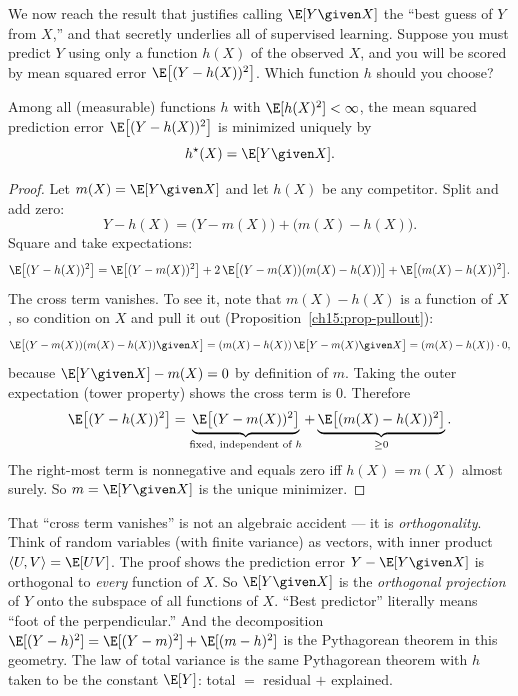 We now reach the result that justifies calling $\E[Y\given X]$ the ``best guess of $Y$ from $X$,'' and
that secretly underlies all of supervised learning. Suppose you must predict $Y$ using only a function
$h(X)$ of the observed $X$, and you will be scored by mean squared error $\E\big[(Y - h(X))^2\big]$.
Which function $h$ should you choose?

\begin{theorem}
\label{ch15:thm-best-predictor}
Among all (measurable) functions $h$ with $\E[h(X)^2] < \infty$, the mean squared prediction error
$\E\big[(Y - h(X))^2\big]$ is minimized uniquely by
\[
  h^\star(X) = \E[Y \given X].
\]
\end{theorem}

\begin{proof}
Let $m(X) = \E[Y\given X]$ and let $h(X)$ be any competitor. Split and add zero:
\[
  Y - h(X) = \big(Y - m(X)\big) + \big(m(X) - h(X)\big).
\]
Square and take expectations:
\[
  \E\big[(Y-h(X))^2\big]
  = \E\big[(Y - m(X))^2\big] + 2\,\E\big[(Y-m(X))(m(X)-h(X))\big] + \E\big[(m(X)-h(X))^2\big].
\]
The cross term vanishes. To see it, note that $m(X) - h(X)$ is a function of $X$, so condition on $X$
and pull it out (Proposition~\ref{ch15:prop-pullout}):
\[
  \E\big[(Y-m(X))(m(X)-h(X)) \given X\big]
  = (m(X)-h(X))\,\E\big[Y - m(X)\given X\big]
  = (m(X)-h(X))\cdot 0,
\]
because $\E[Y\given X] - m(X) = 0$ by definition of $m$. Taking the outer expectation (tower property)
shows the cross term is $0$. Therefore
\[
  \E\big[(Y - h(X))^2\big] = \underbrace{\E\big[(Y-m(X))^2\big]}_{\text{fixed, independent of }h}
  + \underbrace{\E\big[(m(X)-h(X))^2\big]}_{\ge 0}.
\]
The right-most term is nonnegative and equals zero iff $h(X) = m(X)$ almost surely. So $m = \E[Y\given X]$
is the unique minimizer.
\end{proof}

\begin{happeningbox}
That ``cross term vanishes'' is not an algebraic accident --- it is \emph{orthogonality}. Think of
random variables (with finite variance) as vectors, with inner product
$\langle U, V\rangle = \E[UV]$. The proof shows the prediction error $Y - \E[Y\given X]$ is orthogonal
to \emph{every} function of $X$. So $\E[Y\given X]$ is the \emph{orthogonal projection} of $Y$ onto the
subspace of all functions of $X$. ``Best predictor'' literally means ``foot of the perpendicular.'' And
the decomposition $\E[(Y-h)^2] = \E[(Y-m)^2] + \E[(m-h)^2]$ is the Pythagorean theorem in this
geometry. The law of total variance is the same Pythagorean theorem with $h$ taken to be the constant
$\E[Y]$: total $=$ residual $+$ explained.
\end{happeningbox}

